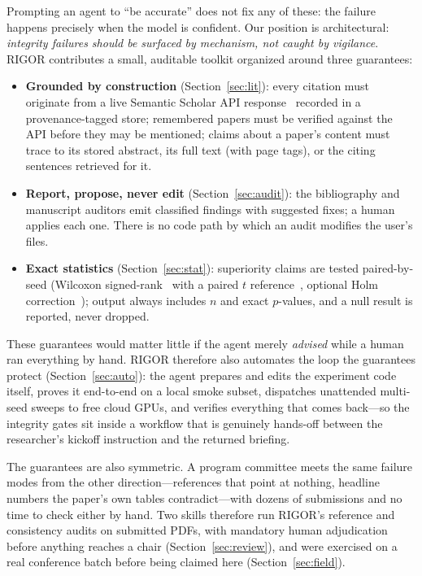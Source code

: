 \documentclass[11pt]{article}
\begin{document}
Prompting an agent to ``be accurate'' does not fix any of these: the failure
happens precisely when the model is confident. Our position is architectural:
\emph{integrity failures should be surfaced by mechanism, not caught by
vigilance}. RIGOR contributes a small, auditable toolkit organized around
three guarantees:

\begin{itemize}
\item \textbf{Grounded by construction} (Section~\ref{sec:lit}): every
citation must originate from a live Semantic Scholar API
response~\cite{kinney2023semanticscholar} recorded in a provenance-tagged
store; remembered papers must be verified against the API before they may be
mentioned; claims about a paper's content must trace to its stored abstract,
its full text (with page tags), or the citing sentences retrieved for it.
\item \textbf{Report, propose, never edit} (Section~\ref{sec:audit}): the
bibliography and manuscript auditors emit classified findings with suggested
fixes; a human applies each one. There is no code path by which an audit
modifies the user's files.
\item \textbf{Exact statistics} (Section~\ref{sec:stat}): superiority claims
are tested paired-by-seed (Wilcoxon signed-rank~\cite{wilcoxon1945individual}
with a paired $t$ reference~\cite{virtanen2020scipy}, optional Holm
correction~\cite{holm1979simple}); output always includes $n$ and exact
$p$-values, and a null result is reported, never dropped.
\end{itemize}

These guarantees would matter little if the agent merely \emph{advised} while
a human ran everything by hand. RIGOR therefore also automates the loop the
guarantees protect (Section~\ref{sec:auto}): the agent prepares and edits the
experiment code itself, proves it end-to-end on a local smoke subset,
dispatches unattended multi-seed sweeps to free cloud GPUs, and verifies
everything that comes back---so the integrity gates sit inside a workflow
that is genuinely hands-off between the researcher's kickoff instruction and
the returned briefing.

The guarantees are also symmetric. A program committee meets the same failure
modes from the other direction---references that point at nothing, headline
numbers the paper's own tables contradict---with dozens of submissions and no
time to check either by hand. Two skills therefore run RIGOR's reference and
consistency audits on submitted PDFs, with mandatory human adjudication before
anything reaches a chair (Section~\ref{sec:review}), and were exercised on a
real conference batch before being claimed here (Section~\ref{sec:field}).
\end{document}
